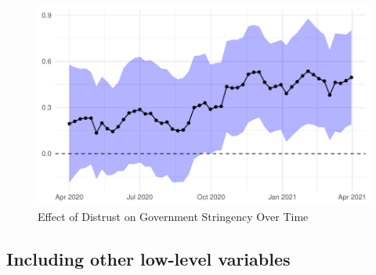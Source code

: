 \documentclass[
  12pt,
]{article}
\begin{document}
\begin{figure}
\includegraphics[width=0.8\linewidth]{write_up_test_files/figure-latex/over-time-1} \caption{Effect of Distrust on Government Stringency Over Time}\label{fig:over-time}
\end{figure}

\hypertarget{including-other-low-level-variables}{%
\subsection{Including other low-level variables}\label{including-other-low-level-variables}}
\end{document}
